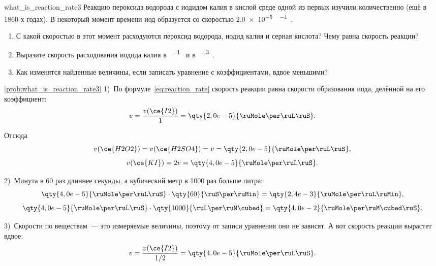 \begin{problem}{}{what_is_reaction_rate3}
    Реакцию пероксида водорода с иодидом калия в кислой среде
    одной из первых изучили количественно (ещё в 1860-х годах). В некоторый момент времени иод образуется со скоростью \qty{2,0e-5}{\ruMole\per\ruL\ruS}.
    \begin{enumerate}[label=\arabic*)]
        \item С какой скоростью в этот момент расходуются пероксид водорода, иодид калия и серная кислота? Чему равна скорость реакции?
        \item Выразите скорость расходования иодида калия в \unit{\ruMole\per\ruL\ruMin} и в \unit{\ruMole\per\ruM\cubed\ruS}.
        \item Как изменятся найденные величины, если записать уравнение с коэффициентами, вдвое меньшими?
    \end{enumerate}
    \begin{sol}{\ref{prob:what_is_reaction_rate3}}
        1)~По формуле~\eqref{eq:reaction_rate} скорость реакции равна скорости образования иода, делённой на его коэффициент:
        \begin{equation*}
            v = \frac{v(\ce{I2})}{1} = \qty{2,0e-5}{\ruMole\per\ruL\ruS}.
        \end{equation*}

        Отсюда
        \begin{equation*}
            v(\ce{H2O2}) = v(\ce{H2SO4}) = v = \qty{2,0e-5}{\ruMole\per\ruL\ruS},
        \end{equation*}
        \begin{equation*}
            v(\ce{KI}) = 2v = \qty{4,0e-5}{\ruMole\per\ruL\ruS}.
        \end{equation*}

        2)~Минута в 60 раз длиннее секунды, а кубический метр в 1000 раз больше литра:
        \begin{equation*}
            \qty{4,0e-5}{\ruMole\per\ruL\ruS} \cdot \qty{60}{\ruS\per\ruMin} = \qty{2,4e-3}{\ruMole\per\ruL\ruMin},
        \end{equation*}
        \begin{equation*}
            \qty{4,0e-5}{\ruMole\per\ruL\ruS} \cdot \qty{1000}{\ruL\per\ruM\cubed} = \qty{4,0e-2}{\ruMole\per\ruM\cubed\ruS}.
        \end{equation*}

        3)~Скорости по веществам~--- это измеряемые величины, поэтому от записи уравнения они не зависят. А вот скорость реакции вырастет вдвое:
        \begin{equation*}
            v = \frac{v(\ce{I2})}{1/2} = \qty{4,0e-5}{\ruMole\per\ruL\ruS}.
        \end{equation*}
    \end{sol}
\end{problem}

